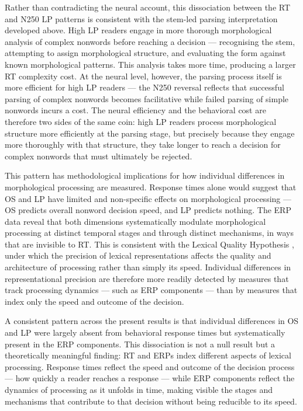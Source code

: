 \documentclass[utf8]{FrontiersinHarvard} %
\begin{document}
	Rather than contradicting the neural account, this dissociation between the RT and N250 LP patterns is consistent with the stem-led parsing interpretation developed above. High LP readers engage in more thorough morphological analysis of complex nonwords before reaching a decision --- recognising the stem, attempting to assign morphological structure, and evaluating the form against known morphological patterns. This analysis takes more time, producing a larger RT complexity cost. At the neural level, however, the parsing process itself is more efficient for high LP readers --- the N250 reversal reflects that successful parsing of complex nonwords becomes facilitative while failed parsing of simple nonwords incurs a cost. The neural efficiency and the behavioral cost are therefore two sides of the same coin: high LP readers process morphological structure more efficiently at the parsing stage, but precisely because they engage more thoroughly with that structure, they take longer to reach a decision for complex nonwords that must ultimately be rejected.

	This pattern has methodological implications for how individual differences in morphological processing are measured. Response times alone would suggest that OS and LP have limited and non-specific effects on morphological processing --- OS predicts overall nonword decision speed, and LP predicts nothing. The ERP data reveal that both dimensions systematically modulate morphological processing at distinct temporal stages and through distinct mechanisms, in ways that are invisible to RT. This is consistent with the Lexical Quality Hypothesis \citep{Perfetti2007}, under which the precision of lexical representations affects the quality and architecture of processing rather than simply its speed. Individual differences in representational precision are therefore more readily detected by measures that track processing dynamics --- such as ERP components --- than by measures that index only the speed and outcome of the decision.
	
	A consistent pattern across the present results is that individual differences in OS and LP were largely absent from behavioral response times but systematically present in the ERP components. This dissociation is not a null result but a theoretically meaningful finding: RT and ERPs index different aspects of lexical processing. Response times reflect the speed and outcome of the decision process --- how quickly a reader reaches a response --- while ERP components reflect the dynamics of processing as it unfolds in time, making visible the stages and mechanisms that contribute to that decision without being reducible to its speed.
	
\end{document}
